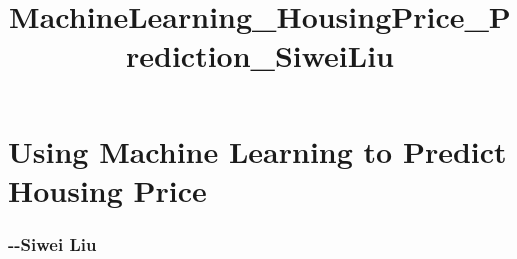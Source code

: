 \documentclass[11pt]{article}
\title{MachineLearning\_HousingPrice\_Prediction\_SiweiLiu}
\begin{document}
    
    
    \maketitle
    
    

    
    \section{Using Machine Learning to Predict Housing
Price}\label{using-machine-learning-to-predict-housing-price}

\subsubsection{-\/-Siwei Liu}\label{siwei-liu}
\end{document}
